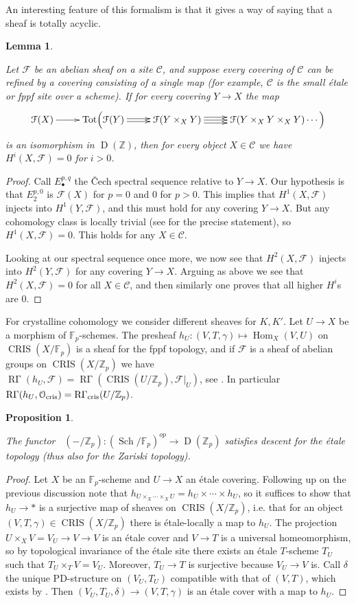 \documentclass[11pt]{article}
\theoremstyle{plain}
\newtheorem{Lem}[Thm]{Lemma}
\newtheorem{Prop}[Thm]{Proposition}
\theoremstyle{definition}
\theoremstyle{remark}
\numberwithin{equation}{section}
\newenvironment{lemma}[1]%
    { \begin{Lem} \label{L:#1}}%
    { \end{Lem} }
\newcommand{\lem}[1]{\begin{lemma}{#1} \sl}
\newcommand{\elem}{\end{lemma}}
\newenvironment{propos}[1]%
    { \begin{Prop} \label{P:#1}}%
    { \end{Prop} }
\newcommand{\prop}[1]{\begin{propos}{#1}\sl }
\newcommand{\eprop}{\end{propos}}
\newcommand{\prf}{ \begin{proof} }
\newcommand{\epr}{ \end{proof} }
\newcommand\Z{\mathbb{Z}}
\newcommand\gam{\gamma}     \newcommand\Gam{\Gamma}
\newcommand\calC{\mathcal{C}}
\newcommand\calF{\mathcal{F}}
\newcommand\calO{\mathcal{O}}
\newcommand{\Fp}{\mathbb{F}_p}
\newcommand{\Zp}{\mathbb{Z}_p}
\DeclareMathOperator{\Hom}{Hom}                                      %
\DeclareMathOperator{\sch}{Sch}                                          %
\DeclareMathOperator{\D}{D}                                              %
\DeclareMathOperator{\Tot}{Tot}                                          %
\DeclareMathOperator{\Rgam}{\text{R}\Gamma}                              %
\DeclareMathOperator{\Cris}{CRIS}                                        %
\DeclareMathOperator{\Rcris}{R\Gamma_{cris}}                             %
\newcommand\ocris{\calO_{\textnormal{cris}}}                             %
\begin{document}
An interesting feature of this formalism is that it gives a way of saying that a sheaf is totally acyclic.

\lem{discesaaciclica}

Let $\calF$ be an abelian sheaf on a site $\calC$, and suppose every covering of $\calC$ can be refined by a covering consisting of a single map (for example, $\calC$ is the small étale or fppf site over a scheme). If for every covering $Y\to X$ the map 
$$
\xymatrix{\calF(X)\ar[r]&\Tot\Bigl(\calF(Y)\ar[r]<1.5pt>\ar[r]<-1.5pt> & \calF(Y\times_X Y)\ar[r]\ar[r]<-3pt>\ar[r]<3pt> & \calF(Y\times_X Y\times_X Y)\dotsb\Bigr)}
$$
is an isomorphism in $\D(\Z)$, then for every object $X\in\calC$ we have $H^i(X,\calF)=0$ for $i>0$.

\elem

\prf

Call $E^{p,q}_{\bullet}$ the \v{C}ech spectral sequence relative to $Y\to X$. Our hypothesis is that $E_2^{p,0}$ is $\calF(X)$ for $p=0$ and $0$ for $p>0$. This implies that $H^1(X,\calF)$ injects into $H^1(Y,\calF)$, and this must hold for any covering $Y\to X$. But any cohomology class is locally trivial (see \cite[Tag 01FW]{stacksproject} for the precise statement), so $H^1(X,\calF)=0$. This holds for any $X\in\calC$.

Looking at our spectral sequence once more, we now see that $H^2(X,\calF)$ injects into $H^2(Y,\calF)$ for any covering $Y\to X$. Arguing as above we see that $H^2(X,\calF)=0$ for all $X\in\calC$, and then similarly one proves that all higher $H^i$s are $0$.\epr

For crystalline cohomology we consider different sheaves for $K,K'$. Let $U\to X$ be a morphism of $\Fp$-schemes. The presheaf $h_U:(V,T,\gamma)\mapsto\Hom_X(V,U)$ on $\Cris(X/\Fp)$ is a sheaf for the fppf topology, and if $\calF$ is a sheaf of abelian groups on $\Cris(X/\Zp)$ we have $\Rgam(h_U,\calF)=\Rgam(\Cris(U/\Zp),\calF|_U)$, see \cite[Tag 03F3]{stacksproject}. In particular $\Rgam(h_U,\ocris)=\Rcris(U/\Zp)$.

\prop{discesaetalecris}

The functor $\Rcris(-/\Zp):(\sch/\Fp)^{op}\to\D(\Zp)$ satisfies descent for the étale topology (thus also for the Zariski topology).

\eprop

\prf

Let $X$ be an $\Fp$-scheme and $U\to X$ an étale covering. Following up on the previous discussion note that $h_{U\times_X\dotsb\times_XU}=h_U\times\dotsb\times h_U$, so it suffices to show that $h_U\to *$ is a surjective map of sheaves on $\Cris(X/\Zp)$, i.e. that for an object $(V,T,\gam)\in\Cris(X/\Zp)$ there is étale-locally a map to $h_U$. The projection $U\times_XV=V_U\to V\to V$ is an étale cover and $V\to T$ is a universal homeomorphism, so by topological invariance of the étale site \cite[Tag 04DZ]{stacksproject} there exists an étale $T$-scheme $T_U$ such that $T_U\times_T V=V_U$. Moreover, $T_U\to T$ is surjective because $V_U\to V$ is. Call $\delta$ the unique PD-structure on $(V_U,T_U)$ compatible with that of $(V,T)$, which exists by \cite[Tag 07H1]{stacksproject}. Then $(V_U,T_U,\delta)\to(V,T,\gamma)$ is an étale cover with a map to $h_U$.\epr
\end{document}
